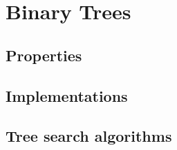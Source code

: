 \chapter{Binary Trees}
\label{chap:binary-trees}

\section{Properties}

\section{Implementations}

\section{Tree search algorithms}